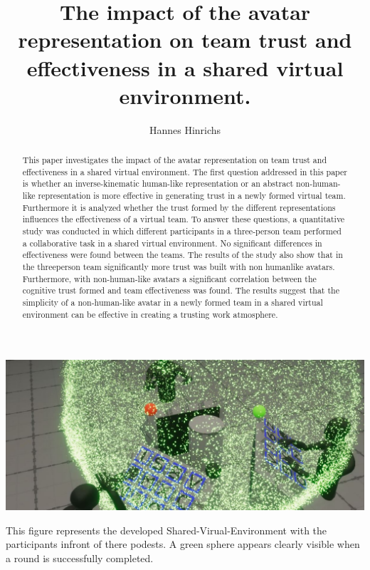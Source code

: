 \documentclass[sigchi]{acmart}
\begin{document}
\title{The impact of the avatar representation on team trust and effectiveness in a shared virtual environment.}

\author{Hannes Hinrichs}

\begin{abstract}
This paper investigates the impact of the avatar representation on team trust and effectiveness in a shared virtual environment. The first question addressed in this paper is whether an inverse-kinematic human-like representation or an abstract non-human-like representation is more effective in generating trust in a newly formed virtual team. Furthermore it is analyzed whether the trust formed by the different representations influences the effectiveness of a virtual team. To answer these questions, a quantitative study was conducted in which different participants in a three-person team performed a collaborative task in a shared virtual environment. No significant differences in effectiveness were found between the teams. The results of the study also show that in the threeperson team significantly more trust was built with non humanlike avatars. Furthermore, with non-human-like avatars a significant correlation between the cognitive trust formed and team effectiveness was found. The results suggest that the simplicity of a non-human-like avatar in a newly formed team in a shared virtual environment can be effective in creating a trusting work atmosphere.
\end{abstract}


\begin{teaserfigure}
  \includegraphics[width=\textwidth]{Abbildungen/RoundSuccsessful2}
  \caption{This figure represents the developed Shared-Virual-Environment with the participants infront of there podests. A green sphere appears clearly visible when a round is successfully completed.}
  \label{fig:teaser}
\end{teaserfigure}
\end{document}
